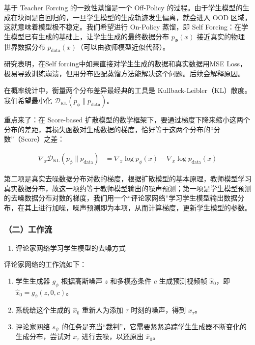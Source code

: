 基于 Teacher Forcing 的一致性蒸馏是一个 Off-Policy 的过程。由于学生模型的生成在块间是自回归的，一旦学生模型的生成轨迹发生偏离，就会进入 OOD 区域，这就意味着模型极不稳定。我们希望进行 On-Policy 蒸馏，即 Self Forcing：在学生模型已有生成的基础上，让学生生成的最终数据分布 \(p_\Phi(x)\) 接近真实的物理世界数据分布 \(p_{\mathrm{data}}(x)\)（可以由教师模型近似代替）。

研究表明，在Self forcing中如果直接对学生生成的数据和真实数据用MSE Loss，极易导致训练崩溃，但用分布匹配蒸馏方法能解决这个问题。后续会解释原因。

在概率统计中，衡量两个分布差异最经典的工具是 Kullback-Leibler（KL）散度。我们希望最小化 \(\mathcal{D}_{\mathrm{KL}}(p_\phi\|p_{\mathrm{data}})\)。

重点来了：在 Score-based 扩散模型的数学框架下，要通过梯度下降来缩小这两个分布的差距，其损失函数对生成数据的梯度，恰好等于这两个分布的``分数''（Score）之差：

\[
\begin{aligned}
\nabla_x\mathcal{D}_{\mathrm{KL}}(p_\phi\|p_{\mathrm{data}})
&=\nabla_x\log p_\phi(x)-\nabla_x\log p_{\mathrm{data}}(x)
\end{aligned}
\]

第二项是真实去噪数据分布对数的梯度，根据扩散模型的基本原理，教师模型学习真实数据分布，故这一项约等于教师模型输出的噪声预测；第一项是学生模型预测的去噪数据分布对数的梯度，我们用一个``评论家网络''学习学生模型输出数据分布，在其上进行加噪，噪声预测即为本项，从而计算梯度，更新学生模型的参数。

\hypertarget{ux4e8cux5de5ux4f5cux6d41-7}{%
\subsubsection{（二）工作流}\label{ux4e8cux5de5ux4f5cux6d41-7}}

\begin{enumerate}
\def\labelenumi{\arabic{enumi}.}
\tightlist
\item
  评论家网络学习学生模型的去噪方式
\end{enumerate}

评论家网络的工作流如下：

\begin{enumerate}
\def\labelenumi{\arabic{enumi}.}
\tightlist
\item
  学生生成器 \(g_\phi\) 根据高斯噪声 \(z\) 和多模态条件 \(c\) 生成预测视频帧 \(\hat{x}_0\)，即 \(\hat{x}_0=g_\phi(z,0,c)\)。
\item
  系统给这个生成的 \(\hat{x}_0\) 重新人为添加 \(\tau\) 时刻的噪声，得到 \(x_\tau\)。
\item
  评论家网络 \(s_\psi\) 的任务是充当``裁判''，它需要紧紧追踪学生生成器不断变化的生成分布，尝试对 \(x_\tau\) 进行去噪，以还原出 \(\hat{x}_0\)。
\end{enumerate}

